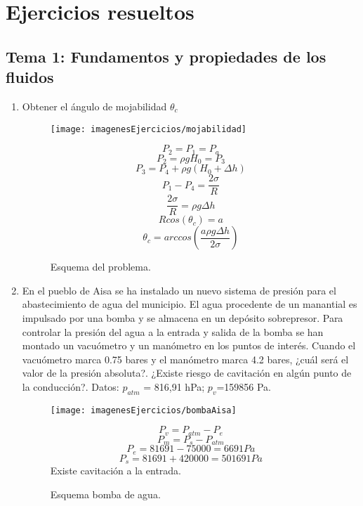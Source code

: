 \section{Ejercicios resueltos}
\subsection{Tema 1: Fundamentos y propiedades de los fluidos}
\begin{enumerate}
	\item Obtener el ángulo de mojabilidad $\theta_c$ 
	\begin{figure}[H]
		\begin{minipage}{0.7\textwidth}
		\centering
		\texttt{[image: imagenesEjercicios/mojabilidad]}
		\caption{Esquema del problema.}
		\label{fig:mojabilidad}
	\end{minipage}%
	\begin{minipage}{0.3\textwidth}
	\[P_2=P_1=P_a\]
	\[P_2=\rho g H_0=P_3\]
	\[P_3=P_4+\rho g (H_0+\Delta h)\]
	\[P_1-P_4=\frac{2\sigma}{R}\]
	\[\frac{2\sigma}{R}=\rho g \Delta h\]
	\[Rcos(\theta_c)=a\]
	\[\theta_c=arccos\left(\frac{a\rho g \Delta h}{2\sigma}\right)\]
	
	\end{minipage}
	\end{figure}
	
	\item En el pueblo de Aisa se ha instalado un nuevo sistema de presión para el abastecimiento
	de agua del municipio. El agua procedente de un manantial es impulsado por una bomba
	y se almacena en un depósito sobrepresor. Para controlar la presión del agua a la entrada
	y salida de la bomba se han montado un vacuómetro y un manómetro en los puntos de
	interés. Cuando el vacuómetro marca 0.75 bares y el manómetro marca 4.2 bares, ¿cuál
	será el valor de la presión absoluta?. ¿Existe riesgo de cavitación en algún punto de la
	conducción?. Datos: $p_{atm}$ = 816,91 hPa; $p_v$=159856 Pa.
	\begin{figure}[H]
		\begin{minipage}{0.7\textwidth}
		\centering
		\texttt{[image: imagenesEjercicios/bombaAisa]}
		\caption{Esquema bomba de agua.}
		\label{fig:bombaaisa}
	\end{minipage}%
	\begin{minipage}{0.3\textwidth}
	\[P_v=P_{atm}-P_e\]
	\[P_m=P_s-P_{atm}\]
\[ P_e=81691-75000=6691 Pa\]
\[P_s=81691+420000=501691 Pa\]
Existe cavitación a la entrada.
	

\end{minipage}
\end{figure}
\end{enumerate}
